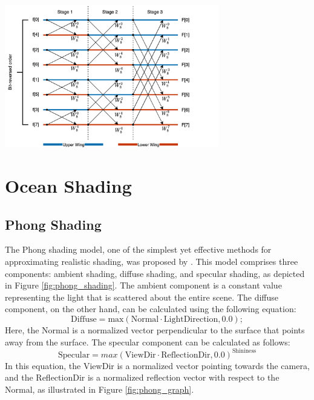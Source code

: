 \begin{minipage}{1\textwidth}
    \centering
    \includegraphics[width=0.7\textwidth]{"images/8_butterfly_diagram.png"}
    \label{fig:8_butterfly_diagram}
\end{minipage}

\section{Ocean Shading}
\subsection{Phong Shading}
The Phong shading model, one of the simplest yet effective methods for approximating realistic shading, was proposed by \cite[Phong Bui Tuong, 1975]{phong1975}. This model comprises three components: ambient shading, diffuse shading, and specular shading, as depicted in Figure \ref{fig:phong_shading}.
The ambient component is a constant value representing the light that is scattered about the entire scene. The diffuse component, on the other hand, can be calculated using the following equation:
\begin{equation}
    \text{Diffuse} = \text{max}(\text{Normal} \cdot \text{LightDirection}, 0.0);
\end{equation}
Here, the Normal is a normalized vector perpendicular to the surface that points away from the surface.
The specular component can be calculated as follows:
\begin{equation}
    \text{Specular} = max(\text{ViewDir} \cdot \text{ReflectionDir}, 0.0)^{\text{Shininess}}
\end{equation}
In this equation, the ViewDir is a normalized vector pointing towards the camera, and the ReflectionDir is a normalized reflection vector with respect to the Normal, as illustrated in Figure \ref{fig:phong_graph}.


